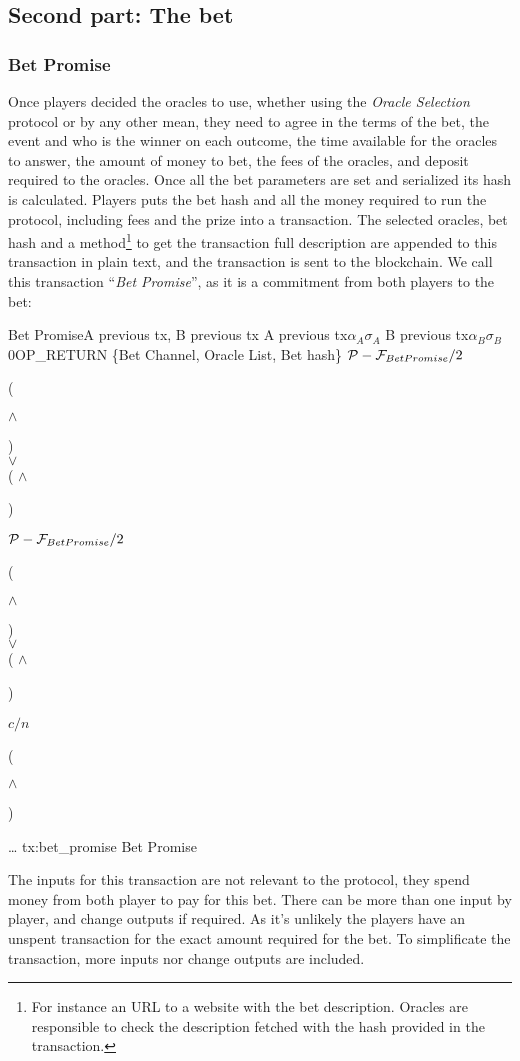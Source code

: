 \subsection{Second part: The bet}

\subsubsection{Bet Promise}
Once players decided the oracles to use, whether using the \textit{Oracle
  Selection} protocol or by any other mean, they need to agree in the terms of
  the bet, the event and who is the winner on each outcome, the time available
  for the oracles to answer, the amount of money to bet, the fees of the
  oracles, and deposit required to the oracles.
Once all the bet parameters are set and serialized its hash is calculated.
Players puts the bet hash and all the money required to run the protocol,
  including fees and the prize into a transaction.
The selected oracles, bet hash and a method\footnote{For instance an URL to a
  website with the bet description. Oracles are responsible to check the
  description fetched with the hash provided in the transaction.} to get the
  transaction full description are appended to this transaction in plain text,
  and the transaction is sent to the blockchain.
We call this transaction ``\textit{Bet Promise}'', as it is a commitment from both
  players to the bet:

\transaction
    {Bet Promise}{A previous tx, B previous tx}
    {A previous tx}{$\alpha_A$}{$\sigma_A$}
    {B previous tx}{$\alpha_B$}{$\sigma_B$}
    \stopinputs
    {0}{\footnotesize{OP\_RETURN \{Bet Channel, Oracle List, Bet hash\}}}
    {$\mathcal{P} - \mathcal{F}_{Bet Promise} / 2$}{(\signature{A} $\wedge$ \signature{B}) \\
                                                   $\vee$ \\
                                            ( $\wedge$ \signature{A}) }
    {$\mathcal{P} - \mathcal{F}_{Bet Promise} / 2$}{(\signature{A} $\wedge$ \signature{B}) \\
                                                   $\vee$ \\
                                            ( $\wedge$ \signature{B}) }
    {$c/n$}{(\signature{A} $\wedge$ \signature{B})}
    {\ldots }{}
    \stopoutputs
    {tx:bet_promise}
    {Bet Promise}

The inputs for this transaction are not relevant to the protocol, they spend
  money from both player to pay for this bet.
There can be more than one input by player, and change outputs if required.
As it's unlikely the players have an unspent transaction for the exact amount
  required for the bet.
To simplificate the transaction, more inputs nor change outputs are included.

